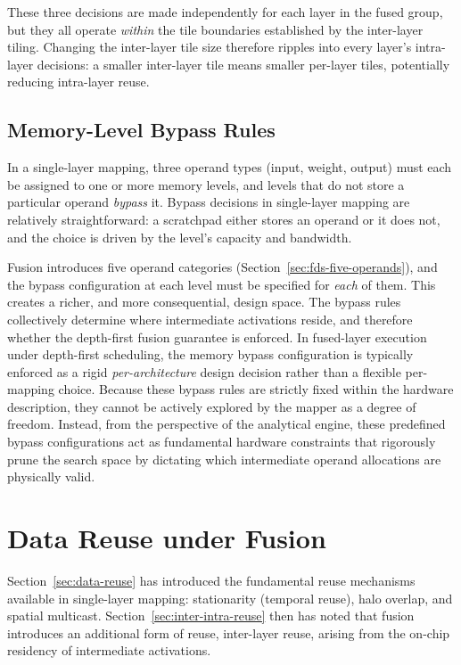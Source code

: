 These three decisions are made independently for each layer in the
fused group, but they all operate \emph{within} the tile boundaries
established by the inter-layer tiling.
Changing the inter-layer tile size therefore ripples into every
layer's intra-layer decisions: a smaller inter-layer tile means
smaller per-layer tiles, potentially reducing intra-layer reuse.


\subsection{Memory-Level Bypass Rules}
\label{sec:fds-bypass}

In a single-layer mapping, three operand types (input, weight, output) must each be assigned to one or more
memory levels, and levels that do not store a particular operand
\emph{bypass} it.
Bypass decisions in single-layer mapping are relatively
straightforward: a scratchpad either stores an operand or it
does not, and the choice is driven by the level's capacity and
bandwidth.

Fusion introduces five operand categories
(Section~\ref{sec:fds-five-operands}), and the bypass configuration
at each level must be specified for \emph{each} of them.
This creates a richer, and more consequential, design space.
The bypass rules collectively determine where intermediate
activations reside, and therefore whether the depth-first fusion
guarantee is enforced.
In fused-layer execution under depth-first scheduling, the memory bypass configuration is typically enforced as a rigid \emph{per-architecture} design decision rather than a flexible per-mapping choice. Because these bypass rules are strictly fixed within the hardware description, they cannot be actively explored by the mapper as a degree of freedom. Instead, from the perspective of the analytical engine, these predefined bypass configurations act as fundamental hardware constraints that rigorously prune the search space by dictating which intermediate operand allocations are physically valid.


\section{Data Reuse under Fusion}
\label{sec:fds-reuse}

Section~\ref{sec:data-reuse} has introduced the fundamental reuse
mechanisms available in single-layer mapping: stationarity (temporal
reuse), halo overlap, and spatial multicast.
Section~\ref{sec:inter-intra-reuse} then has noted that fusion introduces
an additional form of reuse, inter-layer reuse, arising from the
on-chip residency of intermediate activations.

